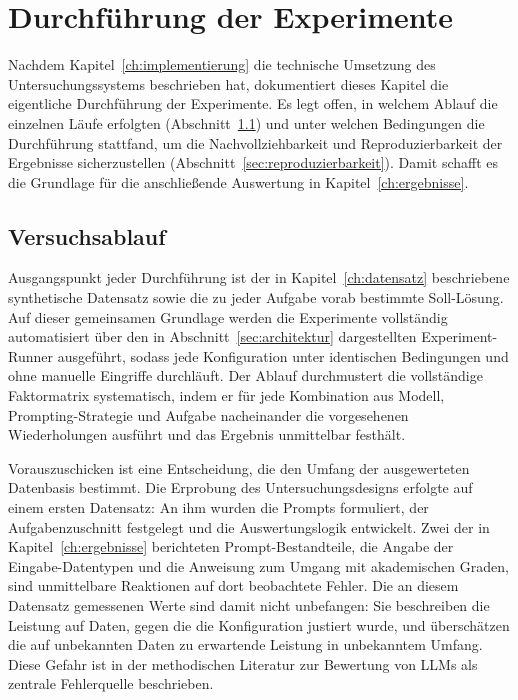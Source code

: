 
\chapter{Durchführung der Experimente}
\label{ch:durchfuehrung}

Nachdem Kapitel~\ref{ch:implementierung} die technische Umsetzung des Untersuchungssystems beschrieben hat, dokumentiert dieses Kapitel die eigentliche Durchführung der Experimente. Es legt offen, in welchem Ablauf die einzelnen Läufe erfolgten (Abschnitt~\ref{sec:versuchsablauf}) und unter welchen Bedingungen die Durchführung stattfand, um die Nachvollziehbarkeit und Reproduzierbarkeit der Ergebnisse sicherzustellen (Abschnitt~\ref{sec:reproduzierbarkeit}). Damit schafft es die Grundlage für die anschließende Auswertung in Kapitel~\ref{ch:ergebnisse}.

\section{Versuchsablauf}
\label{sec:versuchsablauf}

Ausgangspunkt jeder Durchführung ist der in Kapitel~\ref{ch:datensatz} beschriebene synthetische Datensatz sowie die zu jeder Aufgabe vorab bestimmte Soll-Lösung. Auf dieser gemeinsamen Grundlage werden die Experimente vollständig automatisiert über den in Abschnitt~\ref{sec:architektur} dargestellten Experiment-Runner ausgeführt, sodass jede Konfiguration unter identischen Bedingungen und ohne manuelle Eingriffe durchläuft. Der Ablauf durchmustert die vollständige Faktormatrix systematisch, indem er für jede Kombination aus Modell, Prompting-Strategie und Aufgabe nacheinander die vorgesehenen Wiederholungen ausführt und das Ergebnis unmittelbar festhält.

Vorauszuschicken ist eine Entscheidung, die den Umfang der ausgewerteten Datenbasis bestimmt. Die Erprobung des Untersuchungsdesigns erfolgte auf einem ersten Datensatz: An ihm wurden die Prompts formuliert, der Aufgabenzuschnitt festgelegt und die Auswertungslogik entwickelt. Zwei der in Kapitel~\ref{ch:ergebnisse} berichteten Prompt-Bestandteile, die Angabe der Eingabe-Datentypen und die Anweisung zum Umgang mit akademischen Graden, sind unmittelbare Reaktionen auf dort beobachtete Fehler. Die an diesem Datensatz gemessenen Werte sind damit nicht unbefangen: Sie beschreiben die Leistung auf Daten, gegen die die Konfiguration justiert wurde, und überschätzen die auf unbekannten Daten zu erwartende Leistung in unbekanntem Umfang. Diese Gefahr ist in der methodischen Literatur zur Bewertung von \acp{LLM} als zentrale Fehlerquelle beschrieben.

